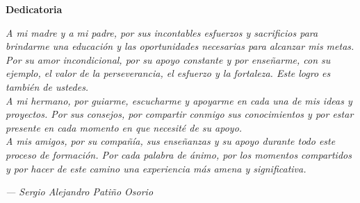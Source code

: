 \cleardoublepage%
%
\thispagestyle{empty}

\vspace*{\fill}

\begin{center}
	{\Large\bfseries Dedicatoria}
\end{center}

\vspace{2cm}

\begin{center}
	\textit{
		A mi madre y a mi padre, por sus incontables esfuerzos y sacrificios para brindarme una educación y las oportunidades necesarias para alcanzar mis metas. Por su amor incondicional, por su apoyo constante y por enseñarme, con su ejemplo, el valor de la perseverancia, el esfuerzo y la fortaleza. Este logro es también de ustedes.\\
		A mi hermano, por guiarme, escucharme y apoyarme en cada una de mis ideas y proyectos. Por sus consejos, por compartir conmigo sus conocimientos y por estar presente en cada momento en que necesité de su apoyo.\\
		A mis amigos, por su compañía, sus enseñanzas y su apoyo durante todo este proceso de formación. Por cada palabra de ánimo, por los momentos compartidos y por hacer de este camino una experiencia más amena y significativa.
	}

	\vspace{2cm}

	\hfill \textit{--- Sergio Alejandro Patiño Osorio}

\end{center}

\vspace*{\fill}

